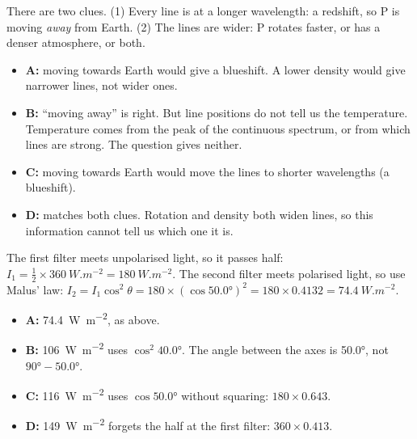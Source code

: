 \begin{practiceanswers}
\begin{practiceans}
  There are two clues. (1) Every line is at a longer wavelength: a redshift, so P is moving
  \emph{away} from Earth. (2) The lines are wider: P rotates faster, or has a denser atmosphere,
  or both.
  \begin{itemize}
    \item[\xmark] \textbf{A:} moving towards Earth would give a blueshift. A lower density would
      give narrower lines, not wider ones.
    \item[\xmark] \textbf{B:} ``moving away'' is right. But line positions do not tell us the
      temperature. Temperature comes from the peak of the continuous spectrum, or from which
      lines are strong. The question gives neither.
    \item[\xmark] \textbf{C:} moving towards Earth would move the lines to shorter wavelengths
      (a blueshift).
    \item[\cmark] \textbf{D:} matches both clues. Rotation and density both widen lines, so this
      information cannot tell us which one it is.
  \end{itemize}
\end{practiceans}

\begin{practiceans}
  The first filter meets unpolarised light, so it passes half:
  $I_1 = \tfrac12 \times \qty{360}{W.m^{-2}} = \qty{180}{W.m^{-2}}$. The second filter meets
  polarised light, so use Malus' law:
  $I_2 = I_1\cos^2\theta = 180 \times (\cos\ang{50.0})^2 = 180 \times 0.4132
  = \qty{74.4}{W.m^{-2}}$.
  \begin{itemize}
    \item[\cmark] \textbf{A:} \qty{74.4}{W.m^{-2}}, as above.
    \item[\xmark] \textbf{B:} \qty{106}{W.m^{-2}} uses $\cos^2\ang{40.0}$. The angle between the
      axes is \ang{50.0}, not $\ang{90} - \ang{50.0}$.
    \item[\xmark] \textbf{C:} \qty{116}{W.m^{-2}} uses $\cos\ang{50.0}$ without squaring:
      $180 \times 0.643$.
    \item[\xmark] \textbf{D:} \qty{149}{W.m^{-2}} forgets the half at the first filter:
      $360 \times 0.413$.
  \end{itemize}
\end{practiceans}


\end{practiceanswers}
